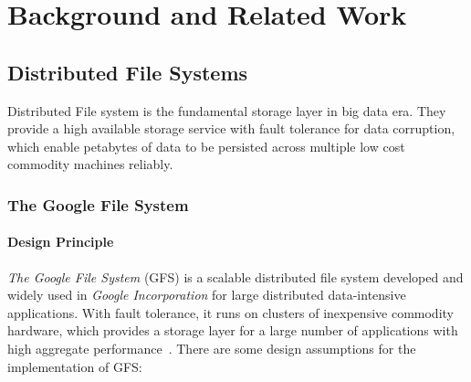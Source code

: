 
%
%


\chapter{Background and Related Work}
\label{ch:Background}

%





\section{Distributed File Systems}

Distributed File system is the fundamental storage layer in big data era. They provide a high available storage service with fault tolerance for data corruption, which enable petabytes of data to be persisted across multiple low cost commodity machines reliably.

\subsection{The Google File System}

\subsubsection{Design Principle}
\textit{The Google File System} (GFS) is a scalable distributed file system developed and widely used in \textit{Google Incorporation} for large distributed data-intensive applications. With fault tolerance, it runs on clusters of inexpensive commodity hardware, which provides a storage layer for a large number of applications with high aggregate performance~\cite{ghemawat2003google}. There are some design assumptions for the implementation of GFS:

